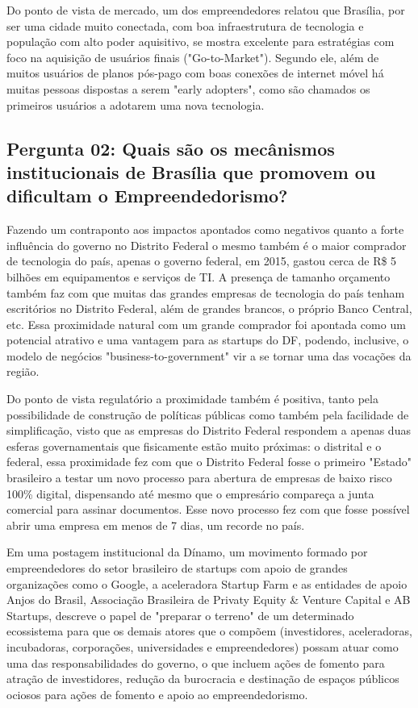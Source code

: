 Do ponto de vista de mercado, um dos empreendedores relatou que Brasília, por ser uma cidade muito conectada, com boa infraestrutura de tecnologia e população com alto poder aquisitivo, se mostra excelente para estratégias com foco na aquisição de usuários finais ("Go-to-Market"). Segundo ele, além de muitos usuários de planos pós-pago com boas conexões de internet móvel há muitas pessoas dispostas a serem "early adopters", como são chamados os primeiros usuários a adotarem uma nova tecnologia.

\subsection*{Pergunta 02: Quais são os mecânismos institucionais de Brasília que promovem ou dificultam o Empreendedorismo?}
\label{subsection:pergunta_de_pesquisa_2}

Fazendo um contraponto aos impactos apontados como negativos quanto a forte influência do governo no Distrito Federal o mesmo também é o maior comprador de tecnologia do país, apenas o governo federal, em 2015, gastou cerca de R\$ 5 bilhões em equipamentos e serviços de TI. A presença de tamanho orçamento também faz com que muitas das grandes empresas de tecnologia do país tenham escritórios no Distrito Federal, além de grandes brancos, o próprio Banco Central, etc. Essa proximidade natural com um grande comprador foi apontada como um potencial atrativo e uma vantagem para as startups do DF, podendo, inclusive, o modelo de negócios "business-to-government" vir a se tornar uma das vocações da região.

Do ponto de vista regulatório a proximidade também é positiva, tanto pela possibilidade de construção de políticas públicas como também pela facilidade de simplificação, visto que as empresas do Distrito Federal respondem a apenas duas esferas governamentais que fisicamente estão muito próximas: o  distrital e o federal, essa proximidade fez com que o Distrito Federal fosse o primeiro "Estado" brasileiro a testar um novo processo para abertura de empresas de baixo risco 100\% digital, dispensando até mesmo que o empresário compareça a junta comercial para assinar documentos. Esse novo processo fez com que fosse possível abrir uma empresa em menos de 7 dias, um recorde no país.

Em uma postagem institucional da Dínamo, um movimento formado por empreendedores do setor brasileiro de startups com apoio de grandes organizações como o Google, a aceleradora Startup Farm e as entidades de apoio Anjos do Brasil, Associação Brasileira de Privaty Equity \& Venture Capital e AB Startups,  descreve o papel de "preparar o terreno" de um determinado ecossistema para que os demais atores que o compõem (investidores, aceleradoras, incubadoras, corporações, universidades e empreendedores) possam atuar como uma das responsabilidades do governo, o que incluem ações de fomento para atração de investidores, redução da burocracia e destinação de espaços públicos ociosos para ações de fomento e apoio ao empreendedorismo.

